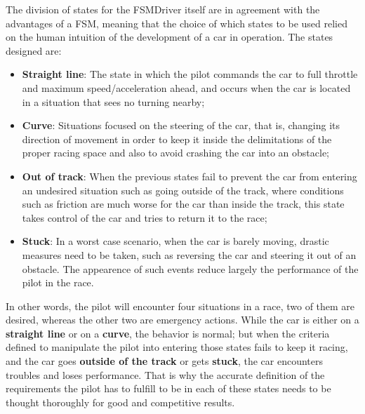 The division of states for the FSMDriver itself are in agreement with the advantages of a FSM, meaning that the choice of which states to be used relied on the human intuition of the development of a car in operation. The states designed are:


\begin{itemize}
	\item \textbf{Straight line}: The state in which the pilot commands the car to full throttle and maximum speed/acceleration ahead, and occurs when the car is located in a situation that sees no turning nearby;
	
	\item \textbf{Curve}: Situations focused on the steering of the car, that is, changing its direction of movement in order to keep it inside the delimitations of the proper racing space and also to avoid crashing the car into an obstacle;
	
	\item \textbf{Out of track}: When the previous states fail to prevent the car from entering an undesired situation such as going outside of the track, where conditions such as friction are much worse for the car than inside the track, this state takes control of the car and tries to return it to the race;
	
	\item \textbf{Stuck}: In a worst case scenario, when the car is barely moving, drastic measures need to be taken, such as reversing the car and steering it out of an obstacle. The appearence of such events reduce largely the performance of the pilot in the race.
\end{itemize}

In other words, the pilot will encounter four situations in a race, two of them are desired, whereas the other two are emergency actions. While the car is either on a \textbf{straight line} or on a \textbf{curve}, the behavior is normal; but when the criteria defined to manipulate the pilot into entering those states fails to keep it racing, and the car goes \textbf{outside of the track} or gets \textbf{stuck}, the car encounters troubles and loses performance. That is why the accurate definition of the requirements the pilot has to fulfill to be in each of these states needs to be thought thoroughly for good and competitive results.
